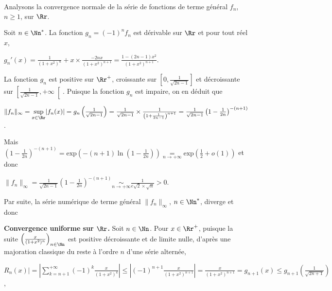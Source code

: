 {\begin{enumerate}
{Analysons la convergence normale de la série de fonctions de terme général $f_n$, $n\geqslant1$, sur $\Rr$.

Soit $n\in\Nn^*$. La fonction $g_n=(-1)^nf_n$ est dérivable sur $\Rr$ et pour tout réel $x$,

\begin{center}
$g_n'(x)=\frac{1}{(1+x^2)^n}+x\times\frac{-2nx}{(1+x^2)^{n+1}}=\frac{1-(2n-1)x^2}{(1+x^2)^{n+1}}$.
\end{center}

La fonction $g_n$ est positive sur $\Rr^+$, croissante sur $\left[0,\frac{1}{\sqrt{2n-1}}\right]$ et décroissante sur $\left[\frac{1}{\sqrt{2n-1}},+\infty\right[$. Puisque la fonction $g_n$ est impaire, on en déduit que

\begin{center}
$\|f_n\|_\infty=\underset{x\in\Rr}{\text{sup}}|f_n(x)|=g_n\left(\frac{1}{\sqrt{2n-1}}\right)=\frac{1}{\sqrt{2n-1}}\times\frac{1}{\left(1+\frac{1}{2n-1}\right)^{n+1}}=\frac{1}{\sqrt{2n-1}}\left(1-\frac{1}{2n}\right)^{-(n+1)}$.
\end{center}

Mais $\left(1-\frac{1}{2n}\right)^{-(n+1)}=\text{exp}\left(-(n+1)\ln\left(1-\frac{1}{2n}\right)\right)\underset{n\rightarrow+\infty}{=}\text{exp}\left(\frac{1}{2}+o(1)\right)$ et donc 

\begin{center}
$\|f_n\|_\infty=\frac{1}{\sqrt{2n-1}}\left(1-\frac{1}{2n}\right)^{-(n+1)}\underset{n\rightarrow+\infty}{\sim}\frac{1}{e\sqrt{2}\times\sqrt{n}}>0$.
\end{center}

Par suite, la série numérique de terme général $\|f_n\|_\infty$, $n\in\Nn^*$, diverge et donc

\begin{center}
\end{center}

\textbf{Convergence uniforme sur $\Rr$.} Soit $n\in\Nn$. Pour $x\in\Rr^+$, puisque la suite $\left(\frac{x}{(1+x^2)^n}\right)_{n\in\Nn}$ est positive décroissante et de limite nulle, d'après une majoration classique du reste à l'ordre $n$ d'une série alternée,

\begin{center}
$R_n(x)|=\left|\sum_{k=n+1}^{+\infty}(-1)^k\frac{x}{(1+x^2)^k}\right|\leqslant\left|(-1)^{n+1}\frac{x}{(1+x^2)^{n+1}}\right|=\frac{x}{(1+x^2)^{n+1}}=g_{n+1}(x)\leqslant g_{n+1}\left(\frac{1}{\sqrt{2n+1}}\right)$,
\end{center}

}
\end{enumerate}}
